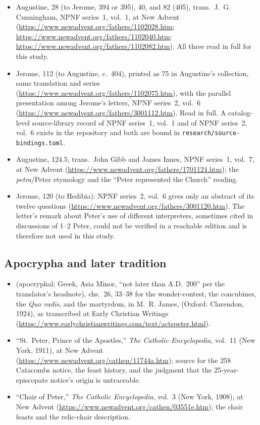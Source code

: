 \begin{itemize}
\item Augustine,  28 (to Jerome, 394 or 395),  40,
and  82 (405), trans.\ J.~G. Cunningham, NPNF series~1, vol.~1,
at New Advent (\url{https://www.newadvent.org/fathers/1102028.htm};
\url{https://www.newadvent.org/fathers/1102040.htm};
\url{https://www.newadvent.org/fathers/1102082.htm}). All three read in
full for this study.
\item Jerome,  112 (to Augustine, c.~404), printed as
 75 in Augustine's collection, same translation and series
(\url{https://www.newadvent.org/fathers/1102075.htm}), with the parallel
presentation among Jerome's letters, NPNF series~2, vol.~6
(\url{https://www.newadvent.org/fathers/3001112.htm}). Read in full. A
catalog-level source-library record of NPNF series~1, vol.~1 and of NPNF
series~2, vol.~6 exists in the repository and both are bound in
\texttt{research/source-bindings.toml}.
\item Augustine,  124.5, trans.\
John Gibb and James Innes, NPNF series~1, vol.~7, at New Advent
(\url{https://www.newadvent.org/fathers/1701124.htm}); the
\textit{petra}/Peter etymology and the ``Peter represented the Church''
reading.
\item Jerome,  120 (to Hedibia): NPNF series~2, vol.~6 gives
only an abstract of its twelve questions
(\url{https://www.newadvent.org/fathers/3001120.htm}). The letter's remark
about Peter's use of different interpreters, sometimes cited in discussions
of 1--2 Peter, could not be verified in a reachable edition and is therefore
not used in this study.
\end{itemize}

\subsection*{Apocrypha and later tradition}

\begin{itemize}
\item {} (apocryphal; Greek, Asia Minor, ``not
later than A.D.\ 200'' per the translator's headnote), chs.\ 26, 33--38 for
the wonder-contest, the concubines, the \textit{Quo vadis}, and the
martyrdom, in M.~R. James, \work{The Apocryphal New Testament} (Oxford:
Clarendon, 1924), as transcribed at Early Christian Writings
(\url{https://www.earlychristianwritings.com/text/actspeter.html}).
\item ``St.~Peter, Prince of the Apostles,'' \textit{The Catholic
Encyclopedia}, vol.~11 (New York, 1911), at New Advent
(\url{https://www.newadvent.org/cathen/11744a.htm}); source for the 258
Catacombs notice, the feast history, and the judgment that the
25-year-episcopate notice's origin is untraceable.
\item ``Chair of Peter,'' \textit{The Catholic Encyclopedia}, vol.~3 (New
York, 1908), at New Advent
(\url{https://www.newadvent.org/cathen/03551e.htm}); the chair feasts and
the relic-chair description.
\end{itemize}

